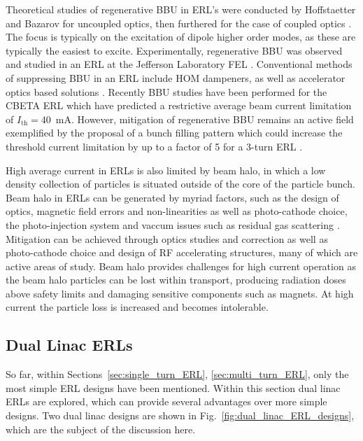\documentclass[../main.tex]{subfiles}
\begin{document}
Theoretical studies of regenerative BBU in ERL's were conducted by Hoffstaetter and Bazarov \cite{hoffstaetter2004beam} for uncoupled optics, then furthered for the case of coupled optics \cite{hoffstaetter2007recirculating}. The focus is typically on the excitation of dipole higher order modes, as these are typically the easiest to excite. Experimentally, regenerative BBU was observed and studied in an ERL at the Jefferson Laboratory FEL \cite{tennant2005first,douglas2006experimental}. Conventional methods of suppressing BBU \cite{tennant2004methods} in an ERL include HOM dampeners, as well as accelerator optics based solutions \cite{rand1980beam}. Recently BBU studies have been performed for the CBETA ERL \cite{lou2019beam} which have predicted a restrictive average beam current limitation of $I_{\mathrm{th}} = 40$~\si{\milli\ampere}. However, mitigation of regenerative BBU remains an active field exemplified by the proposal of a bunch filling pattern which could increase the threshold current limitation by up to a factor of 5 for a 3-turn ERL \cite{setiniyaz2021filling}.    

High average current in ERLs is also limited by beam halo, in which a low density collection of particles is situated outside of the core of the particle bunch. Beam halo in ERLs can be generated by myriad factors, such as the design of optics, magnetic field errors and non-linearities as well as photo-cathode choice, the photo-injection system and vaccum issues such as residual gas scattering \cite{neil2006jlab,tanaka2018new}. Mitigation can be achieved through optics studies and correction as well as photo-cathode choice and design of RF accelerating structures, many of which are active areas of study. Beam halo provides challenges for high current operation as the beam halo particles can be lost within transport, producing radiation doses above safety limits and damaging sensitive components such as magnets. At high current the particle loss is increased and becomes intolerable.

\subsection{Dual Linac ERLs}
So far, within Sections~\ref{sec:single_turn_ERL}, \ref{sec:multi_turn_ERL}, only the most simple ERL designs have been mentioned. Within this section dual linac ERLs are explored, which can provide several advantages over more simple designs. Two dual linac designs are shown in Fig.~\ref{fig:dual_linac_ERL_designs}, which are the subject of the discussion here. 
\end{document}
